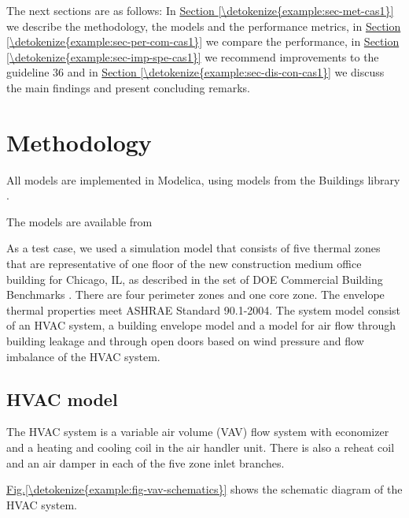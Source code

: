 \documentclass[letterpaper,10pt, openany,english]{sphinxmanual}
\begin{document}
The next sections are as follows:
In \hyperref[\detokenize{example:sec-met-cas1}]{Section \ref{\detokenize{example:sec-met-cas1}}} we describe the methodology,
the models and the performance metrics,
in \hyperref[\detokenize{example:sec-per-com-cas1}]{Section \ref{\detokenize{example:sec-per-com-cas1}}} we compare the performance,
in \hyperref[\detokenize{example:sec-imp-spe-cas1}]{Section \ref{\detokenize{example:sec-imp-spe-cas1}}} we recommend improvements to the
guideline 36 and
in \hyperref[\detokenize{example:sec-dis-con-cas1}]{Section \ref{\detokenize{example:sec-dis-con-cas1}}} we discuss the main findings and present
concluding remarks.


\section{Methodology}
\label{\detokenize{example:methodology}}\label{\detokenize{example:sec-met-cas1}}
All models are implemented in Modelica, using models from
the Buildings library .

The models are available from

As a test case, we used a simulation model that consists
of five thermal zones that are representative of one floor of the
new construction medium office building for Chicago, IL,
as described in the set of DOE Commercial Building Benchmarks
.
There are four perimeter zones and one core zone.
The envelope thermal properties meet ASHRAE Standard 90.1-2004.
The system model consist of an HVAC system, a building envelope model
and a model for air flow through building leakage
and through open doors based on wind pressure and
flow imbalance of the HVAC system.


\subsection{HVAC model}
\label{\detokenize{example:hvac-model}}
The HVAC system is a variable air volume (VAV) flow system
with economizer and a heating and cooling coil in the air handler unit.
There is also a reheat coil and an air damper in each of the five zone
inlet branches.

\hyperref[\detokenize{example:fig-vav-schematics}]{Fig.\@ \ref{\detokenize{example:fig-vav-schematics}}} shows the schematic diagram of the HVAC system.
\end{document}
